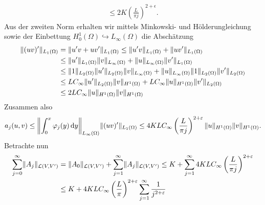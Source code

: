\begin{Satz}
\begin{Beweis}
\begin{equation}
\begin{aligned}
                \leq 2 K \left( \frac{L}{\pi j} \right)^{2+\epsilon}.
            \end{aligned}
        \end{equation}
        Aus der zweiten Norm erhalten wir mittels Minkowski- und Hölderungleichung sowie der Einbettung $H^{1}_{0}(\Omega) \hookrightarrow L_{\infty}(\Omega)$ die Abschätzung
        \begin{equation}
            \begin{aligned}
                \lVert(uv)'\rVert_{L_{1}(\Omega)}
                &= \lVert u'v + uv'\rVert_{L_{1}(\Omega)}
                \leq \lVert u'v\rVert_{L_{1}(\Omega)} + \lVert uv'\rVert_{L_{1}(\Omega)}
                \\&\leq \lVert u'\rVert_{L_{1}(\Omega)} \lVert v\rVert_{L_{\infty}(\Omega)} + \lVert u\rVert_{L_{\infty}(\Omega)} \lVert v'\rVert_{L_{1}(\Omega)}
                \\&\leq \lVert1\rVert_{L_{2}(\Omega)} \lVert u'\rVert_{L_{2}(\Omega)} \lVert v\rVert_{L_{\infty}(\Omega)} + \lVert u\rVert_{L_{\infty}(\Omega)} \lVert1\rVert_{L_{2}(\Omega)} \lVert v'\rVert_{L_{2}(\Omega)}
                \\&\leq L C_{\infty} \lVert u'\rVert_{L_{2}(\Omega)} \lVert v\rVert_{H^{1}(\Omega)} + L C_{\infty} \lVert u\rVert_{H^{1}(\Omega)} \lVert v'\rVert_{L_{2}(\Omega)}
                \\&\leq 2 L C_{\infty} \lVert u\rVert_{H^{1}(\Omega)} \lVert v\rVert_{H^{1}(\Omega)}
            \end{aligned}
        \end{equation}
        Zusammen also
        \begin{equation}
            a_{j}(u, v)
            \leq \norm*{\int_{0}^{x} \varphi_{j}(y) \diff y }_{L_{\infty}(\Omega)} \norm{(uv)'}_{L_{1}(\Omega)}
            \leq 4 K L C_{\infty} \left( \frac{L}{\pi j} \right)^{2+\epsilon} \norm{u}_{H^{1}(\Omega)} \norm{v}_{H^{1}(\Omega)}.
        \end{equation}
        Betrachte nun
        \begin{align}
                    \sum_{j = 0}^{\infty} \norm{A_{j}}_{\mathcal L(V, V')}
            &= \norm{A_{0}}_{\mathcal L(V, V')} + \sum_{j = 1}^{\infty} \norm{A_{j}}_{\mathcal L(V, V')}
            \leq K + \sum_{j = 1}^{\infty} 4 K L C_{\infty} \left( \frac{L}{\pi j} \right)^{2+\epsilon}
            \\&\leq K + 4 K L C_{\infty} \left( \frac{L}{\pi} \right)^{2+\epsilon} \sum_{j = 1}^{\infty} \frac{1}{j^{2 + \epsilon}}

\end{align}
\end{Beweis}
\end{Satz}
